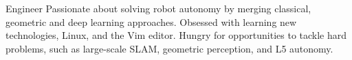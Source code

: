 

\begin{cvparagraph}

Engineer Passionate about solving robot autonomy by merging classical, geometric
and deep learning approaches. Obsessed with learning new technologies, Linux,
and the Vim editor. Hungry for opportunities to tackle hard problems, such as
large-scale SLAM, geometric perception, and L5 autonomy.
\end{cvparagraph}
